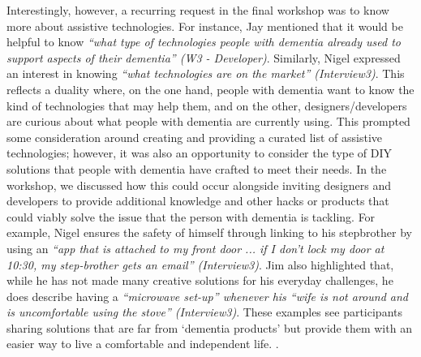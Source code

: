 Interestingly, however, a recurring request in the final workshop was to know more about assistive technologies. For instance, Jay mentioned that it would be helpful to know \textit{``what type of technologies people with dementia already used to support aspects of their dementia'' (W3 - Developer)}. Similarly, Nigel expressed an interest in knowing \textit{``what technologies are on the market'' (Interview3)}. This reflects a duality where, on the one hand, people with dementia want to know the kind of technologies that may help them, and on the other, designers/developers are curious about what people with dementia are currently using. This prompted some consideration around creating and providing a curated list of assistive technologies; however, it was also an opportunity to consider the type of DIY solutions that people with dementia have crafted to meet their needs. In the workshop, we discussed how this could occur alongside inviting designers and developers to provide additional knowledge and other hacks or products that could viably solve the issue that the person with dementia is tackling. For example, Nigel ensures the safety of himself through linking to his stepbrother by using an \textit{``app that is attached to my front door ... if I don’t lock my door at 10:30, my step-brother gets an email'' (Interview3)}. Jim also highlighted that, while he has not made many creative solutions for his everyday challenges, he does describe having a \textit{``microwave set-up” whenever his \textit{``wife is not around and is uncomfortable using the stove'' (Interview3)}}. These examples see participants sharing solutions that are far from ‘dementia products’ but provide them with an easier way to live a comfortable and independent life. .


